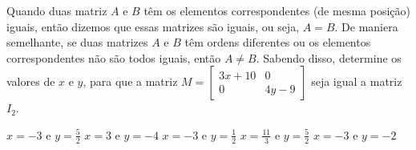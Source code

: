 Quando duas matriz $A$ e $B$ têm os elementos correspondentes (de mesma posição) iguais, então dizemos que essas matrizes são iguais, ou seja, $A=B$. De maniera semelhante, se duas matrizes $A$ e $B$ têm ordens diferentes ou os elementos correspondentes não são todos iguais, então $A\neq B$. Sabendo disso, determine os valores de $x$ e $y$, para que a matriz $M = \left[ \begin{array}{cc}
3x+10 & 0 \\
0 & 4y-9
\end{array} \right]$ seja igual a matriz $I_2$.

$x=-3$ e $y=\frac{5}{2}$
$x=3$ e $y=-4$
$x=-3$ e $y=\frac{1}{2}$
$x=\frac{11}{3}$ e $y=\frac{5}{2}$
$x=-3$ e $y=-2$


